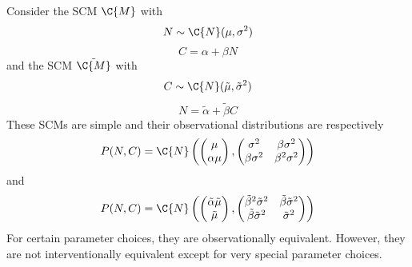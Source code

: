 \begin{Eg}
Consider the SCM $\C{M}$ with
$$N \sim \C{N}(\mu,\sigma^2)$$
$$C = \alpha + \beta N$$
and the SCM $\tilde{\C{M}}$ with
$$C \sim \C{N}(\tilde{\mu},\tilde{\sigma}^2)$$
$$N = \tilde{\alpha} + \tilde{\beta} C$$
These SCMs are simple and their observational distributions are respectively 
  $$P(N,C) = \C{N}\left(\begin{pmatrix} \mu \\ \alpha \mu \end{pmatrix}, \begin{pmatrix} \sigma^2 & \beta\sigma^2 \\ \beta\sigma^2 & \beta^2\sigma^2\end{pmatrix}\right)$$
and
  $$P(N,C) = \C{N}\left(\begin{pmatrix} \tilde{\alpha}\tilde{\mu} \\ \tilde{\mu} \end{pmatrix}, \begin{pmatrix} \tilde{\beta}^2\tilde{\sigma}^2 & \tilde{\beta}\tilde{\sigma}^2 \\ \tilde{\beta}\tilde{\sigma}^2 & \tilde{\sigma}^2\end{pmatrix}\right)$$
For certain parameter choices, they are observationally equivalent.
However, they are not interventionally equivalent except for very special parameter choices.
\end{Eg}

